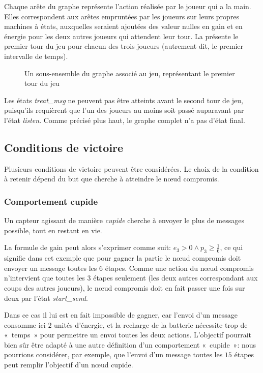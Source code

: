 Chaque arête du graphe représente l'action réalisée par le joueur qui a la main.
Elles correspondent aux arêtes empruntées par les joueurs sur leurs propres machines à états, auxquelles seraient ajoutées des valeur nulles en gain et en énergie pour les deux autres joueurs qui attendent leur tour.
La  présente le premier tour du jeu pour chacun des trois joueurs (autrement dit, le premier intervalle de temps).
\begin{figure}[p]
    \vspace{-1cm}
    \centering
    
    \caption{Un sous-ensemble du graphe associé au jeu, représentant le premier tour du jeu}\label{tj:fig:autFirstTurn}
\end{figure}
Les états \emph{treat\_msg} ne peuvent pas être atteints avant le second tour de jeu, puisqu'ils requièrent que l'un des joueurs au moins soit passé auparavant par l'état \emph{listen}.
Comme précisé plus haut, le graphe complet n'a pas d'état final.

    \subsection{Conditions de victoire}

Plusieurs conditions de victoire peuvent être considérées.
Le choix de la condition à retenir dépend du but que cherche à atteindre le nœud compromis.

        \subsubsection{Comportement cupide}
Un capteur agissant de manière \emph{cupide} cherche à envoyer le plus de messages possible, tout en restant en vie.

La formule de gain peut alors s'exprimer comme suit: $e_3 > 0 \wedge p_3 \geq \frac16$, ce qui signifie dans cet exemple que pour gagner la partie le nœud compromis doit envoyer un message toutes les $6$ étapes.
Comme une action du nœud compromis n'intervient que toutes les $3$ étapes seulement (les deux autres correspondant aux coups des autres joueurs), le nœud compromis doit en fait passer une fois sur deux par l'état \emph{start\_send}.

Dans ce cas il lui est en fait impossible de gagner, car l'envoi d'un message consomme ici $2$ unités d'énergie, et la recharge de la batterie nécessite trop de « temps » pour permettre un envoi toutes les deux actions.
L'objectif pourrait bien sûr être adapté à une autre définition d'un comportement « cupide »: nous pourrions considérer, par exemple, que l'envoi d'un message toutes les $15$ étapes peut remplir l'objectif d'un nœud cupide.

